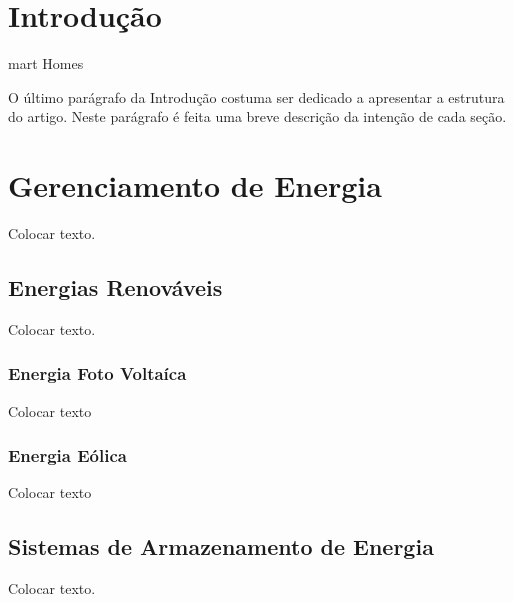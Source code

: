 \documentclass[12pt,article,compsoc]{IEEEtran}
\begin{document}
\section{Introdução}\label{sec:introducao}

mart Homes 

O último parágrafo da Introdução costuma ser dedicado a apresentar a estrutura do artigo. Neste parágrafo é feita uma breve descrição da intenção de cada seção.


\section{Gerenciamento de Energia}\label{sec:gerenciamentoDeEnergia}

Colocar texto.


\subsection{Energias Renováveis}

Colocar texto.


\subsubsection{Energia Foto Voltaíca}

Colocar texto 



\subsubsection{Energia Eólica}

Colocar texto 


\subsection{Sistemas de Armazenamento de Energia}

Colocar texto.
\end{document}
